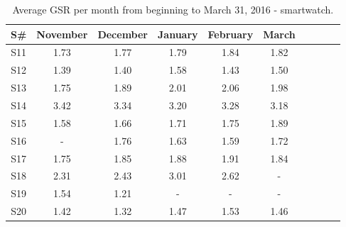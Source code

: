 \documentclass[12pt]{article} %
\begin{document}
\begin{table}[H]
\center
\begin{footnotesize}
	\begin{tabular}{| c | c | c | c | c | c | c | c | c | c |}
	\hline
	\textbf{S\#} & \textbf{November} & \textbf{December} & \textbf{January} & \textbf{February} & \textbf{March} \\
	
	\hline
	S11 & 1.73 & 1.77 & 1.79 & 1.84 & 1.82\\
	\hline
	S12 & 1.39 & 1.40 & 1.58 & 1.43 & 1.50\\
	\hline
	S13 & 1.75 & 1.89 & 2.01 & 2.06 & 1.98\\
	\hline
	S14 & 3.42 & 3.34 & 3.20 & 3.28 & 3.18\\
	\hline
	S15 & 1.58 & 1.66 & 1.71 & 1.75 & 1.89\\
	\hline
	S16 & - & 1.76 & 1.63 & 1.59 & 1.72\\
	\hline
	S17 & 1.75 & 1.85 & 1.88 & 1.91 & 1.84\\
	\hline
	S18 & 2.31 & 2.43 & 3.01 & 2.62 & - \\
	\hline
	S19 & 1.54 & 1.21 & - & - & -\\
	\hline
	S20 & 1.42 & 1.32 & 1.47 & 1.53 & 1.46\\
	\hline
	\end{tabular}
	\caption{Average GSR per month from beginning to March 31, 2016 - smartwatch.}
	\label{tab:GSRWatch}
\end{footnotesize}
\end{table}
\end{document}

